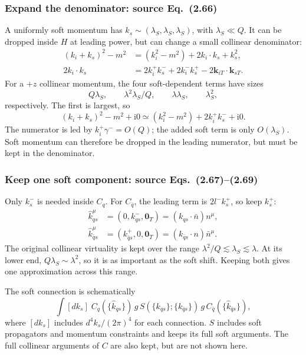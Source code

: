 \documentclass[14pt,a4paper]{extarticle}
\numberwithin{equation}{section}
\newcommand{\ii}{\mathrm i}
\begin{document}
\subsubsection{Expand the denominator: source Eq.~(2.66)}
A uniformly soft momentum has $k_s\sim(\lambda_S,\lambda_S,\lambda_S)$,
with $\lambda_S\ll Q$. It can be dropped inside $H$ at leading power,
but can change a small collinear denominator:
\begin{align}
 (k_i+k_s)^2-m^2&=(k_i^2-m^2)+2k_i\cdot k_s+k_s^2,\\
 2k_i\cdot k_s&=2k_i^+k_s^-+2k_i^-k_s^+
 -2\bm k_{iT}\cdot\bm k_{sT}.
\end{align}
For a $+z$ collinear momentum, the four soft-dependent terms have sizes
\begin{equation}
 Q\lambda_S,\qquad \lambda^2\lambda_S/Q,\qquad
 \lambda\lambda_S,\qquad\lambda_S^2,
\end{equation}
respectively. The first is largest, so
\begin{equation}
 \boxed{(k_i+k_s)^2-m^2+\ii0
 \simeq(k_i^2-m^2)+2k_i^+k_s^-+\ii0.}
\end{equation}
The numerator is led by $k_i^+\gamma^-=O(Q)$; the added soft term is
only $O(\lambda_S)$. Soft momentum can therefore be dropped in the
leading numerator, but must be kept in the denominator.

\subsubsection{Keep one soft component: source Eqs.~(2.67)--(2.69)}
Only $k_s^-$ is needed inside $C_q$. For $C_{\bar q}$, the leading term
is $2l^-k_s^+$, so keep $k_s^+$:
\begin{align}
 \hat k_{qs}^\mu&=(0,k_{qs}^-,\bm0_T)=(k_{qs}\cdot\bar n)n^\mu,\\
 \hat k_{\bar qs}^\mu&=(k_{\bar qs}^+,0,\bm0_T)
 =(k_{\bar qs}\cdot n)\bar n^\mu.
\end{align}
The original collinear virtuality is kept over the range
$\lambda^2/Q\lesssim\lambda_S\lesssim\lambda$.
At its lower end, $Q\lambda_S\sim\lambda^2$, so it is as important as
the soft shift. Keeping both gives one approximation across this range.

The soft connection is schematically
\begin{equation}
 \int[d k_s]\;C_q(\{\hat k_{qs}\})\,g\,
 S(\{k_{qs}\};\{k_{\bar qs}\})\,g\,
 C_{\bar q}(\{\hat k_{\bar qs}\}),
\end{equation}
where $[d k_s]$ includes $d^4k_s/(2\pi)^4$ for each connection.
$S$ includes soft propagators and momentum constraints and keeps its
full soft arguments. The full collinear arguments of $C$ are also kept,
but are not shown here.
\end{document}

